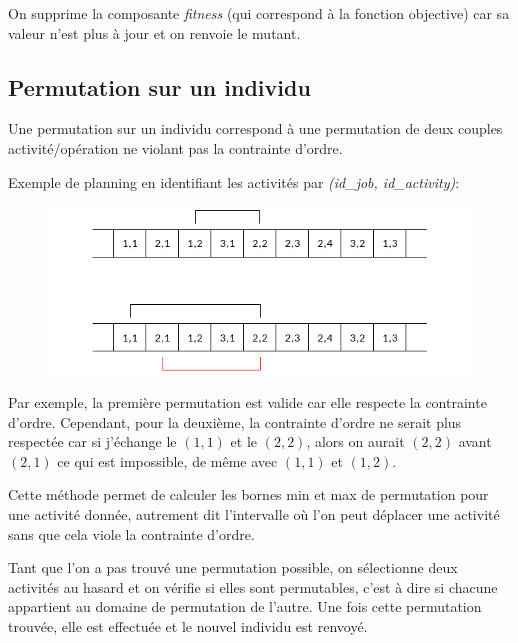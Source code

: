 On supprime la composante \textit{fitness} (qui correspond à la fonction objective) car sa valeur n'est plus à jour et on renvoie le mutant.

\subsection{Permutation sur un individu}

Une permutation sur un individu correspond à une permutation de deux couples activité/opération ne violant pas la contrainte d'ordre. 

Exemple de planning en identifiant les activités par \textit{(id\_job, id\_activity)}:

\begin{figure}[!h]
    \centering
    \includegraphics[scale=0.8]{report/Pictures/permutation.png}
\end{figure}

Par exemple, la première permutation est valide car elle respecte la contrainte d'ordre. Cependant, pour la deuxième, la contrainte d'ordre ne serait plus respectée car si j'échange le $(1,1)$ et le $(2,2)$, alors on aurait $(2,2)$ avant $(2,1)$ ce qui est impossible, de même avec $(1,1)$ et $(1,2)$. 



Cette méthode permet de calculer les bornes min et max de permutation pour une activité donnée, autrement dit l'intervalle où l'on peut déplacer une activité sans que cela viole la contrainte d'ordre.

\newpage



Tant que l'on a pas trouvé une permutation possible, on sélectionne deux activités au hasard et on vérifie si elles sont permutables, c'est à dire si chacune appartient au domaine de permutation de l'autre. Une fois cette permutation trouvée, elle est effectuée et le nouvel individu est renvoyé.

